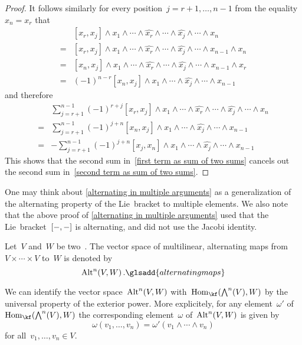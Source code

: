 \begin{proof}
	It follows similarly for every position~$j = r+1, \dotsc, n-1$ from the equality~$x_n = x_r$ that
	\begin{align*}
		{}&
		[x_r, x_j] \wedge x_1 \wedge \dotsb \wedge \widehat{x_r} \wedge \dotsb \wedge \widehat{x_j} \wedge \dotsb \wedge x_n
		\\
		={}&
		[x_r, x_j] \wedge x_1 \wedge \dotsb \wedge \widehat{x_r} \wedge \dotsb \wedge \widehat{x_j} \wedge \dotsb \wedge x_{n-1} \wedge x_n
		\\
		={}&
		[x_n, x_j] \wedge x_1 \wedge \dotsb \wedge \widehat{x_r} \wedge \dotsb \wedge \widehat{x_j} \wedge \dotsb \wedge x_{n-1} \wedge x_r
		\\
		={}&
		(-1)^{n-r}
		[x_n, x_j] \wedge x_1 \wedge \dotsb \wedge \widehat{x_j} \wedge \dotsb \wedge x_{n-1}
	\end{align*}
	and therefore
	\begin{align*}
		{}&
		\sum_{j = r+1}^{n-1}
		(-1)^{r+j}
		[x_r, x_j] \wedge x_1 \wedge \dotsb \wedge \widehat{x_r} \wedge \dotsb \wedge \widehat{x_j} \wedge \dotsb \wedge x_n
		\\
		={}&
		\sum_{j = r+1}^{n-1}
		(-1)^{j+n}
		[x_n, x_j] \wedge x_1 \wedge \dotsb \wedge \widehat{x_j} \wedge \dotsb \wedge x_{n-1}
		\\
		={}&
		-\sum_{j = r+1}^{n-1}
		(-1)^{j+n}
		[x_j, x_n] \wedge x_1 \wedge \dotsb \wedge \widehat{x_j} \wedge \dotsb \wedge x_{n-1}
	\end{align*}
	This shows that the second sum in~\eqref{first term as sum of two sums} cancels out the second sum in~\eqref{second term as sum of two sums}.
\end{proof}


\begin{remark}
	One may think about \cref{alternating in multiple arguments} as a generalization of the alternating property of the Lie~bracket to multiple elements.
	We also note that the above proof of \cref{alternating in multiple arguments} used that the Lie~bracket~$[-, -]$ is alternating, and did not use the Jacobi identity.
\end{remark}


\begin{definition}
	Let~$V$ and~$W$ be two~\vectorspaces{$\kf$}.
	The vector space of multilinear, alternating maps from~$V \times \dotsb \times V$ to~$W$ is denoted by
	\[
		\Alt^n(V,W) \,.
		\glsadd{alternating maps}
	\]
\end{definition}


\begin{recall}
	\label{expressing alt with exterior powers}
	We can identify the vector space~$\operatorname{Alt}^n(V, W)$ with~$\Hom_{\kf}( \Exterior^n(V), W)$ by the universal property of the exterior power.
	More explicitely, for any element~$\omega'$ of~$\Hom_{\kf}( \Exterior^n(V), W)$ the corresponding element~$\omega$ of~$\operatorname{Alt}^n(V,W)$ is given by
	\[
		\omega(v_1, \dotsc, v_n)
		=
		\omega'( v_1 \wedge \dotsb \wedge v_n )
	\]
	for all~$v_1, \dotsc, v_n \in V$.
\end{recall}


